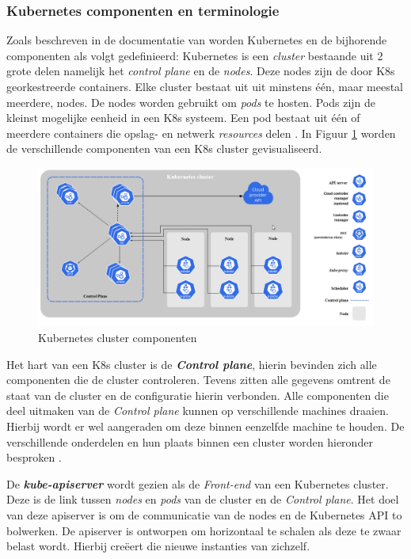 \subsubsection{Kubernetes componenten en terminologie}
Zoals beschreven in de documentatie van \textcite{Pedersen2021, RedHat2021a} worden Kubernetes en de bijhorende componenten als volgt gedefinieerd: Kubernetes is een \textit{cluster} bestaande uit 2 grote delen namelijk het \textit{control plane} en de \textit{nodes}. Deze nodes zijn de door K8s georkestreerde containers. Elke cluster bestaat uit uit minstens één, maar meestal meerdere, nodes. De nodes worden gebruikt om \textit{pods} te hosten. Pods zijn de kleinst mogelijke eenheid in een K8s systeem. Een pod bestaat uit één of meerdere containers die opslag- en netwerk \textit{resources} delen \autocite{RedHat2021a}. In Figuur \ref{fig:K8sComponents} worden de verschillende componenten van een K8s cluster gevisualiseerd.

\begin{figure}[ht]
    \centering
    \includegraphics[width=\linewidth]{img/kubernetes-components.png}
    \caption{Kubernetes cluster componenten \autocite{Kubernetes2021}}
    \label{fig:K8sComponents}
\end{figure}

Het hart van een K8s cluster is de \textbf{\textit{Control plane}}, hierin bevinden zich alle componenten die de cluster controleren. Tevens zitten alle gegevens omtrent de staat van de cluster en de configuratie hierin verbonden. Alle componenten die deel uitmaken van de \textit{Control plane} kunnen op verschillende machines draaien. Hierbij wordt er wel aangeraden om deze binnen eenzelfde machine te houden. De verschillende onderdelen en hun plaats binnen een cluster worden hieronder besproken \autocite{Pedersen2021}.

De \textbf{\textit{kube-apiserver}} wordt gezien als de \textit{Front-end} van een Kubernetes cluster. Deze is de link tussen \textit{nodes} en \textit{pods} van de cluster en de \textit{Control plane}. Het doel van deze apiserver is om de communicatie van de nodes en de Kubernetes API to bolwerken. De apiserver is ontworpen om horizontaal te schalen als deze te zwaar belast wordt. Hierbij creëert die nieuwe instanties van zichzelf.

